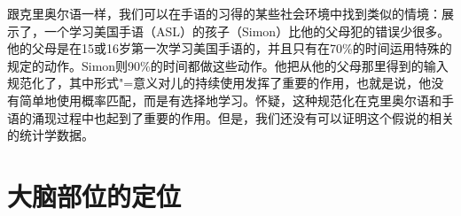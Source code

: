 跟克里奥尔语一样，我们可以在手语的习得的某些社会环境中找到类似的情境：\citet{SN2004a}展示了，一个学习美国手语（ASL）的孩子（Simon）比他的父母犯的错误少很多。他的父母是在15或16岁第一次学习美国手语的，并且只有在70\%的时间运用特殊的规定的动作。Simon则90\%的时间都做这些动作。他把从他的父母那里得到的输入规范化了，其中形式"=意义对儿的持续使用发挥了重要的作用，也就是说，他没有简单地使用概率匹配，而是有选择地学习。\citet[]{SN2004a}怀疑，这种规范化在克里奥尔语和手语的涌现过程中也起到了重要的作用。但是，我们还没有可以证明这个假说的相关的统计学数据。


\section{大脑部位的定位}

